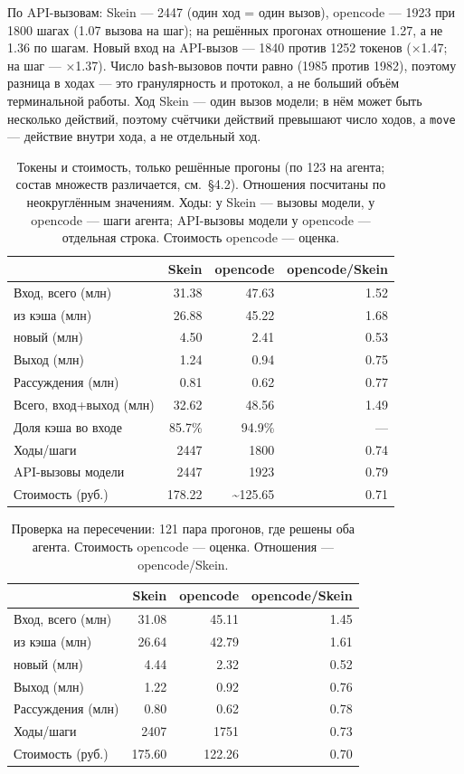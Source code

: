 \documentclass[11pt,a4paper]{article}
\begin{document}
По API-вызовам: Skein --- 2447 (один ход = один вызов), opencode --- 1923 при 1800 шагах
(1.07 вызова на шаг); на решённых прогонах отношение 1.27, а не 1.36 по шагам. Новый вход на
API-вызов --- 1840 против 1252 токенов (×1.47; на шаг --- ×1.37). Число \texttt{bash}-вызовов
почти равно (1985 против 1982), поэтому разница в ходах --- это гранулярность и протокол, а
не больший объём терминальной работы. Ход Skein --- один вызов модели; в нём может быть
несколько действий, поэтому счётчики действий превышают число ходов, а \texttt{move} ---
действие внутри хода, а не отдельный ход.

\begin{table}[t]
\centering
\small
\caption{Токены и стоимость, только решённые прогоны (по 123 на агента; состав множеств
различается, см.~\S4.2). Отношения посчитаны по неокруглённым значениям. Ходы: у Skein ---
вызовы модели, у opencode --- шаги агента; API-вызовы модели у opencode --- отдельная
строка. Стоимость opencode --- оценка.}
\label{tab:tokens}
\begin{tabular}{@{}lrrr@{}}
\toprule
 & Skein & opencode & opencode/Skein \\
\midrule
Вход, всего (млн) & 31.38 & 47.63 & 1.52 \\
\quad из кэша (млн) & 26.88 & 45.22 & 1.68 \\
\quad новый (млн) & 4.50 & 2.41 & 0.53 \\
Выход (млн) & 1.24 & 0.94 & 0.75 \\
Рассуждения (млн) & 0.81 & 0.62 & 0.77 \\
Всего, вход+выход (млн) & 32.62 & 48.56 & 1.49 \\
Доля кэша во входе & 85.7\% & 94.9\% & --- \\
Ходы/шаги & 2447 & 1800 & 0.74 \\
API-вызовы модели & 2447 & 1923 & 0.79 \\
Стоимость (руб.) & 178.22 & \textasciitilde125.65 & 0.71 \\
\bottomrule
\end{tabular}
\end{table}

\begin{table}[t]
\centering
\small
\caption{Проверка на пересечении: 121 пара прогонов, где решены оба агента. Стоимость
opencode --- оценка. Отношения --- opencode/Skein.}
\label{tab:intersection}
\begin{tabular}{@{}lrrr@{}}
\toprule
 & Skein & opencode & opencode/Skein \\
\midrule
Вход, всего (млн) & 31.08 & 45.11 & 1.45 \\
\quad из кэша (млн) & 26.64 & 42.79 & 1.61 \\
\quad новый (млн) & 4.44 & 2.32 & 0.52 \\
Выход (млн) & 1.22 & 0.92 & 0.76 \\
Рассуждения (млн) & 0.80 & 0.62 & 0.78 \\
Ходы/шаги & 2407 & 1751 & 0.73 \\
Стоимость (руб.) & 175.60 & 122.26 & 0.70 \\
\bottomrule
\end{tabular}
\end{table}
\end{document}
